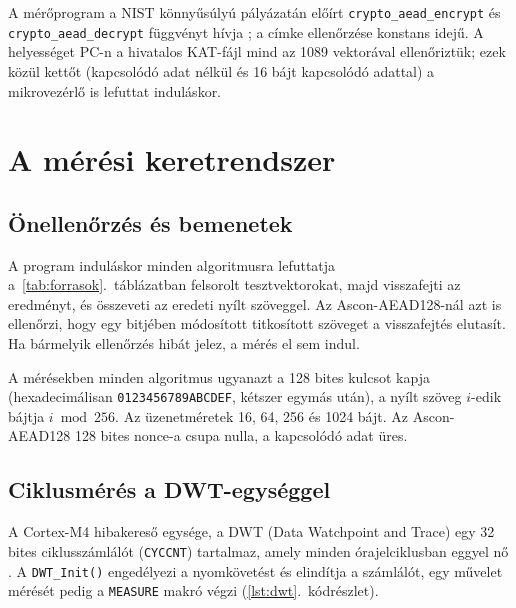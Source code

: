 \documentclass[a4paper,12pt]{report}
\theoremstyle{definition}
\theoremstyle{remark}
\begin{document}
A mérőprogram a NIST könnyűsúlyú pályázatán előírt \texttt{crypto\_aead\_encrypt} és \texttt{crypto\_aead\_decrypt} függvényt hívja \cite{NISTLWC2018}; a címke ellenőrzése konstans idejű. A helyességet PC-n a hivatalos KAT-fájl mind az 1089 vektorával ellenőriztük; ezek közül kettőt (kapcsolódó adat nélkül és 16 bájt kapcsolódó adattal) a mikrovezérlő is lefuttat induláskor.

\section{A mérési keretrendszer}\label{sec:keretrendszer}

\subsection{Önellenőrzés és bemenetek}

A program induláskor minden algoritmusra lefuttatja a~\ref{tab:forrasok}.~táblázatban felsorolt tesztvektorokat, majd visszafejti az eredményt, és összeveti az eredeti nyílt szöveggel. Az Ascon-AEAD128-nál azt is ellenőrzi, hogy egy bitjében módosított titkosított szöveget a visszafejtés elutasít. Ha bármelyik ellenőrzés hibát jelez, a mérés el sem indul.

A mérésekben minden algoritmus ugyanazt a 128 bites kulcsot kapja (hexadecimálisan \texttt{0123456789ABCDEF}, kétszer egymás után), a nyílt szöveg $i$-edik bájtja $i \bmod 256$. Az üzenetméretek 16, 64, 256 és 1024 bájt. Az Ascon-AEAD128 128 bites nonce-a csupa nulla, a kapcsolódó adat üres.

\subsection{Ciklusmérés a DWT-egységgel}

A Cortex-M4 hibakereső egysége, a DWT (Data Watchpoint and Trace) egy 32 bites ciklusszámlálót (\texttt{CYCCNT}) tartalmaz, amely minden órajelciklusban eggyel nő \cite{ARMCM4}. A \mbox{\texttt{DWT\_Init()}} engedélyezi a nyomkövetést és elindítja a számlálót, egy művelet mérését pedig a \texttt{MEASURE} makró végzi (\ref{lst:dwt}.~kódrészlet).
\end{document}
